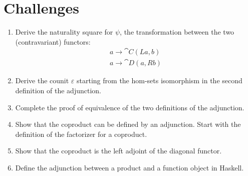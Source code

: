 \section{Challenges}

\begin{enumerate}
  \tightlist
  \item
        Derive the naturality square for $\psi$, the transformation
        between the two (contravariant) functors:
        \begin{gather*}
          a \to \cat{C}(L a, b) \\
          a \to \cat{D}(a, R b)
        \end{gather*}
  \item
        Derive the counit $\varepsilon$ starting from the hom-sets isomorphism in
        the second definition of the adjunction.
  \item
        Complete the proof of equivalence of the two definitions of the
        adjunction.
  \item
        Show that the coproduct can be defined by an adjunction. Start with
        the definition of the factorizer for a coproduct.
  \item
        Show that the coproduct is the left adjoint of the diagonal functor.
  \item
        Define the adjunction between a product and a function object in
        Haskell.
\end{enumerate}
